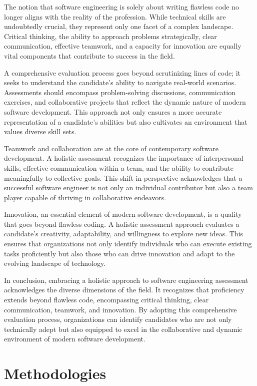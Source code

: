 \documentclass[
    a4paper, %
    10pt, %
    unnumberedsections, %
    twoside, %
]{LTJournalArticle}
\begin{document}
The notion that software engineering is solely about writing flawless code no longer aligns with the reality of the profession. While technical skills are undoubtedly crucial, they represent only one facet of a complex landscape. Critical thinking, the ability to approach problems strategically, clear communication, effective teamwork, and a capacity for innovation are equally vital components that contribute to success in the field.

A comprehensive evaluation process goes beyond scrutinizing lines of code; it seeks to understand the candidate's ability to navigate real-world scenarios. Assessments should encompass problem-solving discussions, communication exercises, and collaborative projects that reflect the dynamic nature of modern software development. This approach not only ensures a more accurate representation of a candidate's abilities but also cultivates an environment that values diverse skill sets.

Teamwork and collaboration are at the core of contemporary software development. A holistic assessment recognizes the importance of interpersonal skills, effective communication within a team, and the ability to contribute meaningfully to collective goals. This shift in perspective acknowledges that a successful software engineer is not only an individual contributor but also a team player capable of thriving in collaborative endeavors.

Innovation, an essential element of modern software development, is a quality that goes beyond flawless coding. A holistic assessment approach evaluates a candidate's creativity, adaptability, and willingness to explore new ideas. This ensures that organizations not only identify individuals who can execute existing tasks proficiently but also those who can drive innovation and adapt to the evolving landscape of technology.

In conclusion, embracing a holistic approach to software engineering assessment acknowledges the diverse dimensions of the field. It recognizes that proficiency extends beyond flawless code, encompassing critical thinking, clear communication, teamwork, and innovation. By adopting this comprehensive evaluation process, organizations can identify candidates who are not only technically adept but also equipped to excel in the collaborative and dynamic environment of modern software development.


\section{Methodologies}
\end{document}
